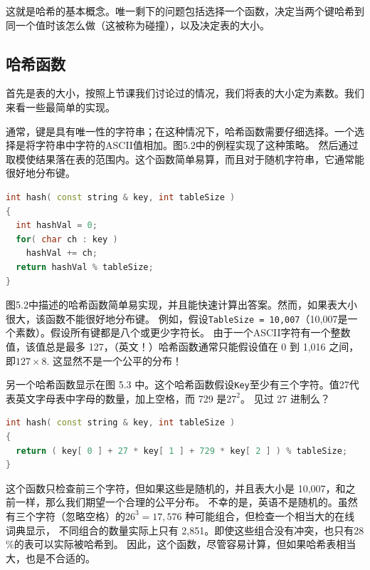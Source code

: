 \documentclass[a4paper]{ctexart}
\theoremstyle{definition}
\theoremstyle{definition}
\begin{document}
这就是哈希的基本概念。唯一剩下的问题包括选择一个函数，决定当两个键哈希到同一个值时该怎么做（这被称为碰撞），以及决定表的大小。

\subsection{哈希函数}


首先是表的大小，按照上节课我们讨论过的情况，我们将表的大小定为素数。我们来看一些最简单的实现。

通常，键是具有唯一性的字符串；在这种情况下，哈希函数需要仔细选择。一个选择是将字符串中字符的ASCII值相加。图5.2中的例程实现了这种策略。
然后通过取模使结果落在表的范围内。这个函数简单易算，而且对于随机字符串，它通常能很好地分布键。

\begin{lstlisting}[language=C++]
int hash( const string & key, int tableSize )
{
  int hashVal = 0;
  for( char ch : key )
    hashVal += ch;
  return hashVal % tableSize;
}
\end{lstlisting}  

图5.2中描述的哈希函数简单易实现，并且能快速计算出答案。然而，如果表大小很大，该函数不能很好地分布键。
例如，假设\texttt{TableSize = 10,007}（10,007是一个素数）。假设所有键都是八个或更少字符长。
由于一个ASCII字符有一个整数值，该值总是最多 127，（英文！）哈希函数通常只能假设值在 0 到 1,016 之间，即\(127 \times 8\). 
这显然不是一个公平的分布！

另一个哈希函数显示在图 5.3 中。这个哈希函数假设\texttt{Key}至少有三个字符。值27代表英文字母表中字母的数量，加上空格，而 729 是\(27^2\)。
见过 27 进制么？
\begin{lstlisting}[language=C++]
int hash( const string & key, int tableSize )
{
  return ( key[ 0 ] + 27 * key[ 1 ] + 729 * key[ 2 ] ) % tableSize;
}  
\end{lstlisting}
这个函数只检查前三个字符，但如果这些是随机的，并且表大小是 10,007，和之前一样，那么我们期望一个合理的公平分布。
不幸的是，英语不是随机的。虽然有三个字符（忽略空格）的\(26^3 = 17,576\) 种可能组合，但检查一个相当大的在线词典显示，
不同组合的数量实际上只有 2,851。即使这些组合没有冲突，也只有28 \%的表可以实际被哈希到。
因此，这个函数，尽管容易计算，但如果哈希表相当大，也是不合适的。
\end{document}
